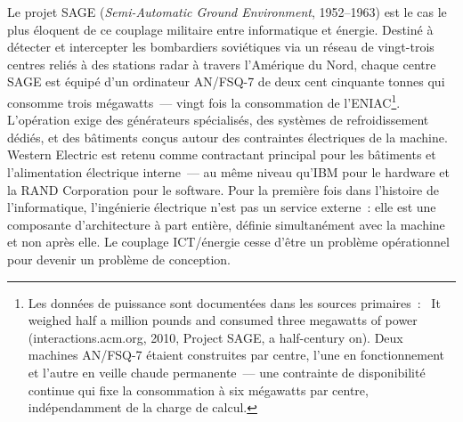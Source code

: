 %
Le projet SAGE (\emph{Semi-Automatic Ground Environment}, 1952--1963) est le cas le plus éloquent de ce couplage militaire entre informatique et énergie. Destiné à détecter et intercepter les bombardiers soviétiques via un réseau de vingt-trois centres reliés à des stations radar à travers l'Amérique du Nord, chaque centre SAGE est équipé d'un ordinateur AN/FSQ-7 de deux cent cinquante tonnes qui consomme trois mégawatts~--- vingt fois la consommation de l'ENIAC\footnote{Les données de puissance sont documentées dans les sources primaires~: \og~It weighed half a million pounds and consumed three megawatts of power\fg{} (interactions.acm.org, 2010, \og Project SAGE, a half-century on\fg{}). Deux machines AN/FSQ-7 étaient construites par centre, l'une en fonctionnement et l'autre en veille chaude permanente~--- une contrainte de disponibilité continue qui fixe la consommation à six mégawatts par centre, indépendamment de la charge de calcul.}. L'opération exige des générateurs spécialisés, des systèmes de refroidissement dédiés, et des bâtiments conçus autour des contraintes électriques de la machine. Western Electric est retenu comme contractant principal pour les bâtiments et l'alimentation électrique interne~--- au même niveau qu'IBM pour le hardware et la RAND Corporation pour le software. Pour la première fois dans l'histoire de l'informatique, l'ingénierie électrique n'est pas un service externe~: elle est une composante d'architecture à part entière, définie simultanément avec la machine et non après elle. Le couplage ICT/énergie cesse d'être un problème opérationnel pour devenir un problème de conception.

